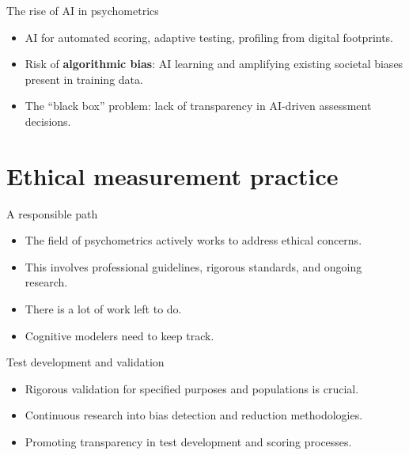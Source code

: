 \documentclass[aspectratio=169]{beamer}
\begin{document}
\begin{frame}{The rise of AI in psychometrics}
  \begin{itemize}
    \item AI for automated scoring, adaptive testing, profiling from digital footprints.\pause
    \item Risk of \textbf{algorithmic bias}: AI learning and amplifying existing societal biases present in training data.\pause
    \item The ``black box'' problem: lack of transparency in AI-driven assessment decisions.
  \end{itemize}
\end{frame}

\section{Ethical measurement practice}

\begin{frame}{A responsible path}
  \begin{itemize}
    \item The field of psychometrics actively works to address ethical concerns.\pause
    \item This involves professional guidelines, rigorous standards, and ongoing research.\pause
    \item There is a lot of work left to do.\pause
    \item Cognitive modelers need to keep track.
  \end{itemize}
\end{frame}

\begin{frame}{Test development and validation}
  \begin{itemize}
    \item Rigorous validation for specified purposes and populations is crucial.\pause
    \item Continuous research into bias detection and reduction methodologies.\pause
    \item Promoting transparency in test development and scoring processes.
  \end{itemize}
\end{frame}
\end{document}
